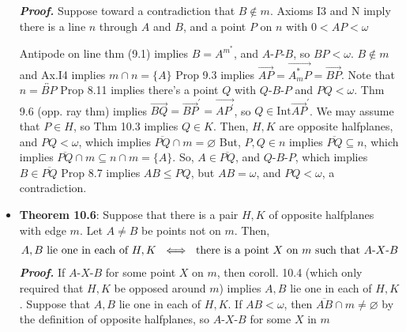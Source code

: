\documentclass{report}
\begin{document}
\begin{itemize}
            \bigbreak \noindent 
            \textbf{\textit{Proof.}} Suppose toward a contradiction that $B \not\in m$. Axioms I3 and N imply there is a line $n$ through $A$ and $B$, and a point $P$ on $n$ with $0 < AP < \omega$
            \bigbreak \noindent 
            \begin{figure}[ht]
                \centering
                \label{fig:stac}
            \end{figure}
            \bigbreak \noindent 
            Antipode on line thm (9.1) implies $B = A^{m}^{*}$, and $ A\text{-}P\text{-}B$, so $BP < \omega$.
            \bigbreak \noindent 
            $B \not\in m$ and Ax.I4 implies $m\cap n = \{A\} $
            \bigbreak \noindent 
            Prop 9.3 implies $\overrightarrow{AP} = \overrightarrow{A_{m}^{*}P} = \overrightarrow{BP}$. Note that $n = \overleftrightarrow{BP} $
            \bigbreak \noindent 
            Prop 8.11 implies there's a point $Q$ with $ Q\text{-}B\text{-}P$ and $PQ < \omega$.
            \bigbreak \noindent 
            Thm 9.6 (opp. ray thm) implies $\overrightarrow{BQ} = \overrightarrow{BP}^{\prime} = \overrightarrow{AP^{\prime}}$, so $Q \in \text{Int}\overrightarrow{AP}^{\prime}$. We may assume that $P \in H$, so Thm 10.3 implies $Q \in K$. Then, $H,K$ are opposite halfplanes, and $PQ < \omega$, which implies $\overline{PQ} \cap m  = \varnothing $
            \bigbreak \noindent 
            But, $P,Q \in  n$ implies  $\overline{PQ} \subseteq n$, which implies $\overline{PQ} \cap m \subseteq n \cap m = \{A\} $. So, $A \in \overline{PQ}$, and $ Q\text{-}B\text{-}P$, which implies $ B \in \overline{PQ}$
            \bigbreak \noindent 
            Prop 8.7 implies $AB \leq PQ$, but $AB = \omega$, and $PQ < \omega$, a contradiction.
            \endpf
        \item \textbf{Theorem 10.6}: Suppose that there is a pair $H,K$ of opposite halfplanes with edge $m$. Let $A \ne B$ be points not on $m$. Then, 
            \begin{align*}
                A,B \text{ lie one in each of $H,K$ } \iff \text{ there is a point $X$ on $m$ such that $ A\text{-}X\text{-}B $}
            \end{align*}
            \bigbreak \noindent 
            \textbf{\textit{Proof.}} If $ A\text{-}X\text{-}B$ for some point $X$ on $m$, then coroll. 10.4 (which only required that $H,K$ be opposed around $m$) implies $A,B$ lie one in each of $H,K$.
            \bigbreak \noindent 
            Suppose that $A,B$ lie one in each of $H,K$. If $AB < \omega$, then $\overline{AB} \cap m \ne \varnothing $ by the definition of opposite halfplanes, so $ A\text{-}X\text{-} B$ for some $X$ in $m$

\end{itemize}
\end{document}
